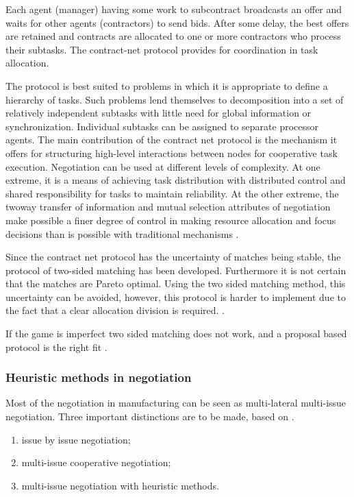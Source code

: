 Each agent (manager) having some work to subcontract broadcasts an offer and waits for other agents (contractors) to send bids. After some delay, the best offers are retained and contracts are allocated to one or more contractors who process their subtasks. The contract-net protocol provides for coordination in task allocation. 

The protocol is best suited to problems in which it is appropriate to define a hierarchy of tasks. Such problems lend themselves to decomposition into a set of relatively independent subtasks with little need for global information or synchronization. Individual subtasks can be assigned to separate processor agents. The main contribution of the contract net protocol is the mechanism it offers for structuring high-level interactions between nodes for cooperative task execution. Negotiation can be used at different levels of complexity. At one extreme, it is a means of achieving task distribution with distributed control and shared responsibility for tasks to maintain reliability. At the other extreme, the twoway transfer of information and mutual selection attributes of negotiation  make possible a finer degree of control in making resource allocation and focus decisions than is possible with traditional mechanisms \citep{smith1980communication}.

Since the contract net protocol has the uncertainty of matches being stable, the protocol of two-sided matching has been developed. Furthermore it is not certain that the matches are Pareto optimal. Using the two sided matching method, this uncertainty can be avoided, however, this protocol is harder to implement due to the fact that a clear allocation division is required. \citep{fatima2014principles}.
 
If the game is imperfect two sided matching does not work, and a proposal based protocol is the right fit \citep{rahwan2003argumentation}.




\subsubsection{Heuristic methods in negotiation}
Most of the negotiation in manufacturing can be seen as multi-lateral multi-issue negotiation. Three important distinctions are to be made, based on \citet{lai2004literature}. 
\begin{enumerate}
	\item
	issue by issue negotiation;
	\item
	multi-issue cooperative negotiation;
	\item
	multi-issue negotiation with heuristic methods.
	\end{enumerate}
	
